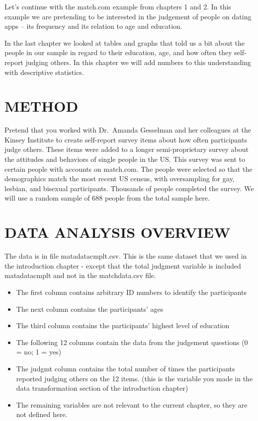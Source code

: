 \documentclass[
]{book}
\providecommand{\tightlist}{%
  \setlength{\itemsep}{0pt}\setlength{\parskip}{0pt}}
\begin{document}
Let's continue with the match.com example from chapters 1 and 2. In this example we are pretending to be interested in the judgement of people on dating apps -- its frequency and its relation to age and education.

In the last chapter we looked at tables and graphs that told us a bit about the people in our sample in regard to their education, age, and how often they self-report judging others. In this chapter we will add numbers to this understanding with descriptive statistics.

\hypertarget{method-1}{%
\section{METHOD}\label{method-1}}

Pretend that you worked with Dr.~Amanda Gesselman and her colleagues at the Kinsey Institute to create self-report survey items about how often participants judge others. These items were added to a longer semi-proprietary survey about the attitudes and behaviors of single people in the US. This survey was sent to certain people with accounts on match.com. The people were selected so that the demographics match the most recent US census, with oversampling for gay, lesbian, and bisexual participants. Thousands of people completed the survey. We will use a random sample of 688 people from the total sample here.

\hypertarget{data-analysis-overview-1}{%
\section{DATA ANALYSIS OVERVIEW}\label{data-analysis-overview-1}}

The data is in file matadatacmplt.csv. This is the same dataset that we used in the introduction chapter - except that the total judgment variable is included matadatacmplt and not in the matchdata.csv file.

\begin{itemize}
\tightlist
\item
  The first column contains arbitrary ID numbers to identify the participants\\
\item
  The next column contains the participants' ages\\
\item
  The third column contains the participants' highest level of education\\
\item
  The following 12 columns contain the data from the judgement questions (0 = no; 1 = yes)\\
\item
  The judgmt column contains the total number of times the participants reported judging others on the 12 items. (this is the variable you made in the data transformation section of the introduction chapter)\\
\item
  The remaining variables are not relevant to the current chapter, so they are not defined here.
\end{itemize}
\end{document}
